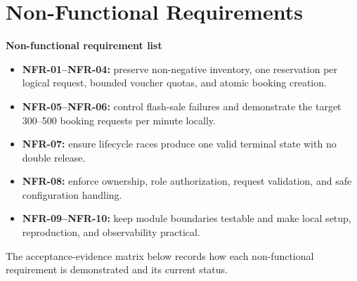 \section{Non-Functional Requirements}
\textbf{Non-functional requirement list}
\begin{itemize}[leftmargin=*,itemsep=0pt,topsep=2pt]
\item \textbf{NFR-01--NFR-04:} preserve non-negative inventory, one reservation per logical request, bounded voucher quotas, and atomic booking creation.
\item \textbf{NFR-05--NFR-06:} control flash-sale failures and demonstrate the target 300--500 booking requests per minute locally.
\item \textbf{NFR-07:} ensure lifecycle races produce one valid terminal state with no double release.
\item \textbf{NFR-08:} enforce ownership, role authorization, request validation, and safe configuration handling.
\item \textbf{NFR-09--NFR-10:} keep module boundaries testable and make local setup, reproduction, and observability practical.
\end{itemize}

The acceptance-evidence matrix below records how each non-functional
requirement is demonstrated and its current status.

